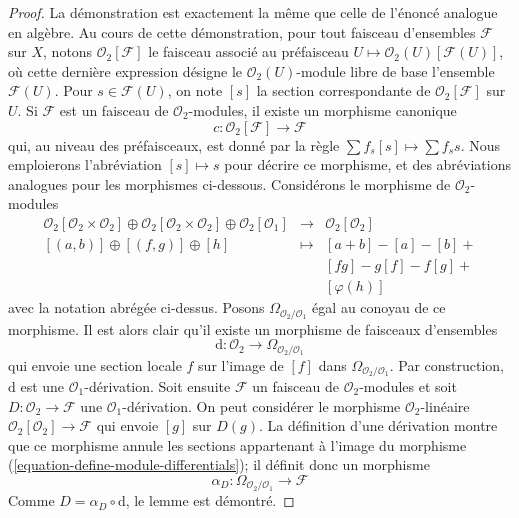 \begin{proof}
La démonstration est exactement la même que celle de l'énoncé analogue en
algèbre. Au cours de cette démonstration, pour tout faisceau d'ensembles
$\mathcal{F}$ sur $X$, notons $\mathcal{O}_2[\mathcal{F}]$ le faisceau
associé au préfaisceau $U \mapsto \mathcal{O}_2(U)[\mathcal{F}(U)]$, où
cette dernière expression désigne le $\mathcal{O}_2(U)$-module libre de base
l'ensemble $\mathcal{F}(U)$. Pour $s \in \mathcal{F}(U)$, on note $[s]$ la
section correspondante de $\mathcal{O}_2[\mathcal{F}]$ sur $U$. Si
$\mathcal{F}$ est un faisceau de $\mathcal{O}_2$-modules, il existe un
morphisme canonique
$$
c : \mathcal{O}_2[\mathcal{F}] \longrightarrow \mathcal{F}
$$
qui, au niveau des préfaisceaux, est donné par la règle
$\sum f_s[s] \mapsto \sum f_s s$. Nous emploierons l'abréviation
$[s] \mapsto s$ pour décrire ce morphisme, et des abréviations analogues
pour les morphismes ci-dessous. Considérons le morphisme de
$\mathcal{O}_2$-modules
\begin{equation}
\label{equation-define-module-differentials}
\begin{matrix}
\mathcal{O}_2[\mathcal{O}_2 \times \mathcal{O}_2] \oplus
\mathcal{O}_2[\mathcal{O}_2 \times \mathcal{O}_2] \oplus
\mathcal{O}_2[\mathcal{O}_1] &
\longrightarrow &
\mathcal{O}_2[\mathcal{O}_2] \\
[(a, b)] \oplus [(f, g)] \oplus [h] & \longmapsto & [a + b] - [a] - [b] + \\
& & [fg] - g[f] - f[g] + \\
& & [\varphi(h)]
\end{matrix}
\end{equation}
avec la notation abrégée ci-dessus. Posons
$\Omega_{\mathcal{O}_2/\mathcal{O}_1}$ égal au conoyau de ce morphisme.
Il est alors clair qu'il existe un morphisme de faisceaux d'ensembles
$$
\text{d} : \mathcal{O}_2 \longrightarrow \Omega_{\mathcal{O}_2/\mathcal{O}_1}
$$
qui envoie une section locale $f$ sur l'image de $[f]$ dans
$\Omega_{\mathcal{O}_2/\mathcal{O}_1}$. Par construction, $\text{d}$ est une
$\mathcal{O}_1$-dérivation. Soit ensuite $\mathcal{F}$ un faisceau de
$\mathcal{O}_2$-modules et soit
$D : \mathcal{O}_2 \to \mathcal{F}$ une $\mathcal{O}_1$-dérivation.
On peut considérer le morphisme $\mathcal{O}_2$-linéaire
$\mathcal{O}_2[\mathcal{O}_2] \to \mathcal{F}$ qui envoie $[g]$ sur $D(g)$.
La définition d'une dérivation montre que ce morphisme annule les sections
appartenant à l'image du morphisme
(\ref{equation-define-module-differentials}); il définit donc un morphisme
$$
\alpha_D : \Omega_{\mathcal{O}_2/\mathcal{O}_1} \longrightarrow \mathcal{F}
$$
Comme $D = \alpha_D \circ \text{d}$, le lemme est démontré.
\end{proof}

